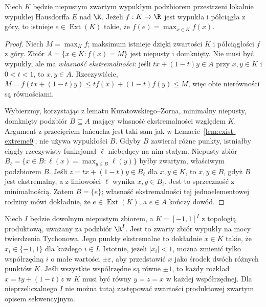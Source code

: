 \begin{wniosek}
\label{cor:bauer9}
Niech $K$ będzie niepustym zwartym wypukłym podzbiorem
przestrzeni lokalnie wypukłej Hausdorffa $E$ nad $\K$.
Jeżeli $f:K\to\R$ jest wypukła i półciągła z góry,
to istnieje $e\in\operatorname{Ext}(K)$ takie,
że $f(e)=\max_{x\in K}f(x)$.
\end{wniosek}
\begin{proof}
Niech $M=\max_K f$; maksimum istnieje dzięki zwartości $K$
i półciągłości $f$ z góry. Zbiór $A=\{x\in K:f(x)=M\}$
jest niepusty i domknięty. Nie musi być wypukły, ale ma
\emph{własność ekstremalności}: jeśli $tx+(1-t)y\in A$
przy $x,y\in K$ i $0<t<1$, to $x,y\in A$. Rzeczywiście,
$M=f(tx+(1-t)y)\le tf(x)+(1-t)f(y)\le M$,
więc obie nierówności są równościami.

Wybierzmy, korzystając z lematu Kuratowskiego--Zorna,
minimalny niepusty, domknięty podzbiór $B\subseteq A$
mający własność ekstremalności względem $K$.
Argument z przecięciem łańcucha jest taki sam jak
w Lemacie~\ref{lem:exist-extreme9}; nie używa wypukłości $B$.
Gdyby $B$ zawierał różne punkty, istniałby ciągły rzeczywisty
funkcjonał $\ell$ niebędący na nim stałym. Niepusty zbiór
$B_\ell=\{x\in B:\ell(x)=\max_{y\in B}\ell(y)\}$
byłby zwartym, właściwym podzbiorem $B$.
Jeśli $z=tx+(1-t)y\in B_\ell$ dla $x,y\in K$, to
$x,y\in B$, gdyż $B$ jest ekstremalny, a z liniowości
$\ell$ wynika $x,y\in B_\ell$. Jest to sprzeczność
z minimalnością. Zatem $B=\{e\}$; własność ekstremalności
tej jednoelementowej rodziny mówi dokładnie,
że $e\in\operatorname{Ext}(K)$, a $e\in A$ kończy dowód.
\end{proof}

\begin{przyklad}
\label{ex:krein-cube9}
Niech $I$ będzie dowolnym niepustym zbiorem,
a $K=[-1,1]^I$ z topologią produktową, uważany za
podzbiór $\R^I$. Jest to zwarty zbiór wypukły na mocy
twierdzenia Tychonowa. Jego punkty ekstremalne to dokładnie
$x\in K$ takie, że $x_i\in\{-1,1\}$ dla każdego $i\in I$.
Istotnie, jeżeli $|x_i|<1$, można zmienić tylko współrzędną
$i$ o małe wartości $\pm\varepsilon$, aby przedstawić
$x$ jako środek dwóch różnych punktów $K$.
Jeśli wszystkie współrzędne są równe $\pm1$, to każdy
rozkład $x=ty+(1-t)z$ w $K$ musi być równy $y=z=x$
w każdej współrzędnej.
Dla nieprzeliczalnego $I$ nie można tutaj zastępować
zwartości produktowej zwartym opisem sekwencyjnym.
\end{przyklad}

